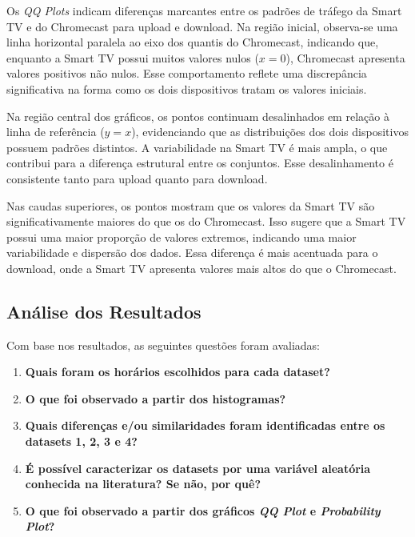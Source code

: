 Os \textit{QQ Plots} indicam diferenças marcantes entre os padrões de tráfego da Smart TV e do Chromecast para upload e download. Na região inicial, observa-se uma linha horizontal paralela ao eixo dos quantis do Chromecast, indicando que, enquanto a Smart TV possui muitos valores nulos (\(x = 0\)), Chromecast apresenta valores positivos não nulos. Esse comportamento reflete uma discrepância significativa na forma como os dois dispositivos tratam os valores iniciais.

Na região central dos gráficos, os pontos continuam desalinhados em relação à linha de referência (\(y = x\)), evidenciando que as distribuições dos dois dispositivos possuem padrões distintos. A variabilidade na Smart TV é mais ampla, o que contribui para a diferença estrutural entre os conjuntos. Esse desalinhamento é consistente tanto para upload quanto para download.

Nas caudas superiores, os pontos mostram que os valores da Smart TV são significativamente maiores do que os do Chromecast. Isso sugere que a Smart TV possui uma maior proporção de valores extremos, indicando uma maior variabilidade e dispersão dos dados. Essa diferença é mais acentuada para o download, onde a Smart TV apresenta valores mais altos do que o Chromecast.

\subsection{Análise dos Resultados}

Com base nos resultados, as seguintes questões foram avaliadas:
\begin{enumerate}
    \item \textbf{Quais foram os horários escolhidos para cada dataset?}
    \item \textbf{O que foi observado a partir dos histogramas?}
    \item \textbf{Quais diferenças e/ou similaridades foram identificadas entre os datasets 1, 2, 3 e 4?}
    \item \textbf{É possível caracterizar os datasets por uma variável aleatória conhecida na literatura? Se não, por quê?}
    \item \textbf{O que foi observado a partir dos gráficos \textit{QQ Plot} e \textit{Probability Plot}?}
\end{enumerate}
